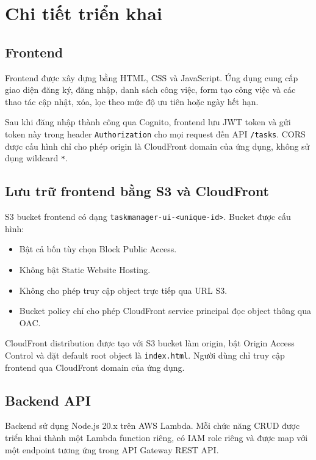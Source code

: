 \section{Chi tiết triển khai}

\subsection{Frontend}

Frontend được xây dựng bằng HTML, CSS và JavaScript. Ứng dụng cung cấp giao diện đăng ký, đăng nhập, danh sách công việc, form tạo công việc và các thao tác cập nhật, xóa, lọc theo mức độ ưu tiên hoặc ngày hết hạn.

Sau khi đăng nhập thành công qua Cognito, frontend lưu JWT token và gửi token này trong header \texttt{Authorization} cho mọi request đến API \texttt{/tasks}. CORS được cấu hình chỉ cho phép origin là CloudFront domain của ứng dụng, không sử dụng wildcard \texttt{*}.

\subsection{Lưu trữ frontend bằng S3 và CloudFront}

S3 bucket frontend có dạng \texttt{taskmanager-ui-<unique-id>}. Bucket được cấu hình:

\begin{itemize}
    \item Bật cả bốn tùy chọn Block Public Access.
    \item Không bật Static Website Hosting.
    \item Không cho phép truy cập object trực tiếp qua URL S3.
    \item Bucket policy chỉ cho phép CloudFront service principal đọc object thông qua OAC.
\end{itemize}

CloudFront distribution được tạo với S3 bucket làm origin, bật Origin Access Control và đặt default root object là \texttt{index.html}. Người dùng chỉ truy cập frontend qua CloudFront domain của ứng dụng.

\subsection{Backend API}

Backend sử dụng Node.js 20.x trên AWS Lambda. Mỗi chức năng CRUD được triển khai thành một Lambda function riêng, có IAM role riêng và được map với một endpoint tương ứng trong API Gateway REST API.


